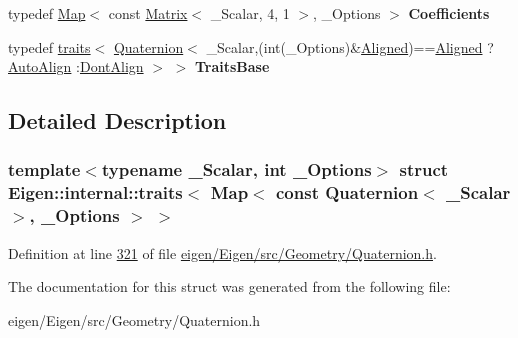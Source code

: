 \begin{DoxyCompactItemize}
\item 
\mbox{\label{struct_eigen_1_1internal_1_1traits_3_01_map_3_01const_01_quaternion_3_01___scalar_01_4_00_01___options_01_4_01_4_a7f06dc786624ddaab7233c12eaf696d1}} 
typedef \hyperlink{group___core___module_class_eigen_1_1_map}{Map}$<$ const \hyperlink{group___core___module_class_eigen_1_1_matrix}{Matrix}$<$ \+\_\+\+Scalar, 4, 1 $>$, \+\_\+\+Options $>$ {\bfseries Coefficients}
\item 
\mbox{\label{struct_eigen_1_1internal_1_1traits_3_01_map_3_01const_01_quaternion_3_01___scalar_01_4_00_01___options_01_4_01_4_aab4d999273f7f2590a7a6e40dd00ac6c}} 
typedef \hyperlink{struct_eigen_1_1internal_1_1traits}{traits}$<$ \hyperlink{group___geometry___module_class_eigen_1_1_quaternion}{Quaternion}$<$ \+\_\+\+Scalar,(int(\+\_\+\+Options)\&\hyperlink{group__enums_gga45fe06e29902b7a2773de05ba27b47a1ad37d4c71425bb286e9b4103830538fbf}{Aligned})==\hyperlink{group__enums_gga45fe06e29902b7a2773de05ba27b47a1ad37d4c71425bb286e9b4103830538fbf}{Aligned} ? \hyperlink{group__enums_ggaacded1a18ae58b0f554751f6cdf9eb13a28d63c0dd8560827162decfd898804f4}{Auto\+Align} \+:\hyperlink{group__enums_ggaacded1a18ae58b0f554751f6cdf9eb13a40a452614141522dd313363dbbd65726}{Dont\+Align} $>$ $>$ {\bfseries Traits\+Base}
\end{DoxyCompactItemize}


\subsection{Detailed Description}
\subsubsection*{template$<$typename \+\_\+\+Scalar, int \+\_\+\+Options$>$\newline
struct Eigen\+::internal\+::traits$<$ Map$<$ const Quaternion$<$ \+\_\+\+Scalar $>$, \+\_\+\+Options $>$ $>$}



Definition at line \hyperlink{eigen_2_eigen_2src_2_geometry_2_quaternion_8h_source_l00321}{321} of file \hyperlink{eigen_2_eigen_2src_2_geometry_2_quaternion_8h_source}{eigen/\+Eigen/src/\+Geometry/\+Quaternion.\+h}.



The documentation for this struct was generated from the following file\+:\begin{DoxyCompactItemize}
\item 
eigen/\+Eigen/src/\+Geometry/\+Quaternion.\+h\end{DoxyCompactItemize}
